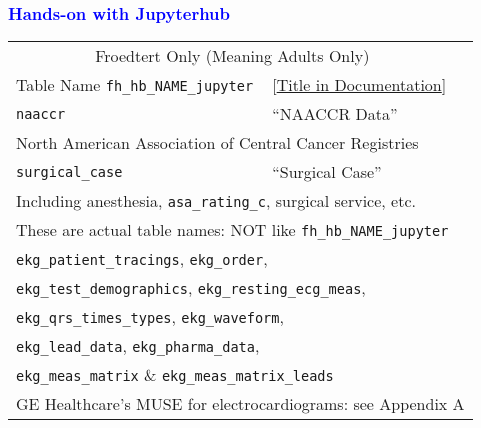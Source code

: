\documentclass[11pt,pdftex,dvipsnames,usenames]{beamer}
\begin{document}
\begin{frame}[fragile]\frametitle{\bf\textcolor{blue}{Hands-on with Jupyterhub}}
\begin{tabular}{lll}
\multicolumn{2}{c}{Froedtert Only (Meaning Adults Only)} \\
Table Name  \texttt{fh\_hb\_NAME\_jupyter} & 
\textcolor{PineGreen}{[\href{https://ctri.mcw.edu/wp-content/uploads/CTSI-Honest-Broker-Data-Dictionary.pdf}{Title in Documentation}]} \\ \hline
\texttt{naaccr}       & ``NAACCR Data'' \\ 
\multicolumn{3}{l}{North American Association of Central Cancer Registries} \\ \hline 
\texttt{surgical\_case}       & ``Surgical Case'' \\ 
\multicolumn{3}{l}{Including anesthesia, \texttt{asa\_rating\_c}, surgical service, etc.} \\ \hline
\multicolumn{2}{l}{These are actual table names: 
NOT like \texttt{fh\_hb\_NAME\_jupyter}} \\
\multicolumn{2}{l}{\texttt{ekg\_patient\_tracings}, \texttt{ekg\_order},} \\
\multicolumn{2}{l}{\texttt{ekg\_test\_demographics}, \texttt{ekg\_resting\_ecg\_meas},} \\
\multicolumn{2}{l}{\texttt{ekg\_qrs\_times\_types}, \texttt{ekg\_waveform},} \\
\multicolumn{2}{l}{\texttt{ekg\_lead\_data}, \texttt{ekg\_pharma\_data},} \\
\multicolumn{2}{l}{\texttt{ekg\_meas\_matrix} \& \texttt{ekg\_meas\_matrix\_leads}} \\
\multicolumn{3}{l}{GE Healthcare's MUSE for electrocardiograms: see Appendix A} \\ \hline
\end{tabular}

\end{frame}
\end{document}

